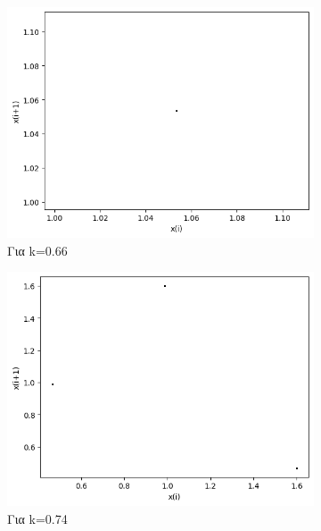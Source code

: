 \begin{figure}[h!]
	\centering
	\begin{subfigure}[b]{0.4\textwidth}
		\centering
		\includegraphics[width=\textwidth]{LateX images/graphs q19/g9}
		\caption{Για k=0.66}
		\label{f:k98}
	\end{subfigure}
	\hfill
	\begin{subfigure}[b]{0.4\textwidth}
		\centering
		\includegraphics[width=\textwidth]{LateX images/graphs q19/g10}
		\caption{Για k=0.74}
		\label{f:k99}
	\end{subfigure}
	\hfill
	\begin{subfigure}[b]{0.4\textwidth}
		\centering

\end{subfigure}
\end{figure}

